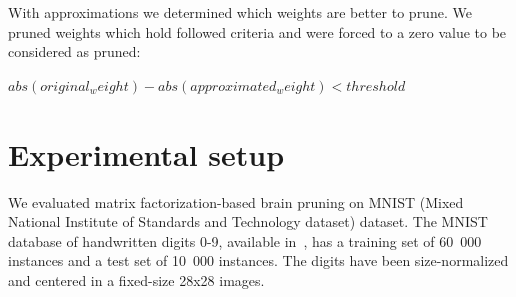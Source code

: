 \documentclass{article} %
\begin{document}
With approximations we determined which weights are better to prune. We pruned
weights which hold followed criteria and were forced to a zero value to be
considered as pruned:

$abs(original_weight) - abs(approximated_weight) < threshold$




\section{Experimental setup}

We evaluated matrix factorization-based brain pruning on MNIST (Mixed National
Institute of Standards and Technology dataset) dataset. The MNIST database of
handwritten digits 0-9, available in~\cite{lecun-mnisthandwrittendigit-2010},
has a training set of 60~000 instances and a test set of 10~000 instances. The
digits have been size-normalized and centered in a fixed-size 28x28 images.
\end{document}
